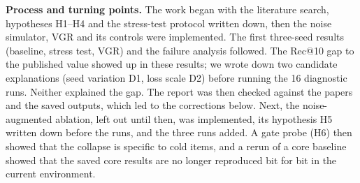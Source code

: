 \documentclass[conference]{IEEEtran}
\begin{document}
\textbf{Process and turning points.} The work began with the literature search, hypotheses H1--H4 and the stress-test protocol written down, then the noise simulator, VGR and its controls were implemented. The first three-seed results (baseline, stress test, VGR) and the failure analysis followed. The Rec@10 gap to the published value showed up in these results; we wrote down two candidate explanations (seed variation D1, loss scale D2) before running the 16 diagnostic runs. Neither explained the gap. The report was then checked against the papers and the saved outputs, which led to the corrections below. Next, the noise-augmented ablation, left out until then, was implemented, its hypothesis H5 written down before the runs, and the three runs added. A gate probe (H6) then showed that the collapse is specific to cold items, and a rerun of a core baseline showed that the saved core results are no longer reproduced bit for bit in the current environment.
\end{document}
